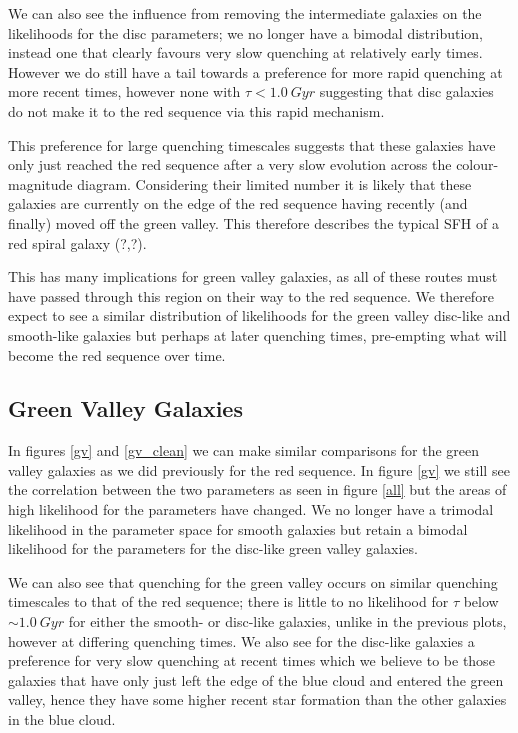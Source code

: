 \documentclass{mn2e}
\begin{document}
We can also see the influence from removing the intermediate galaxies on the likelihoods for the disc parameters; we no longer have a bimodal distribution, instead one that clearly favours very slow quenching at relatively early times. However we do still have a tail towards a preference for more rapid quenching at more recent times, however none with $\tau < 1.0~Gyr$ suggesting that disc galaxies do not make it to the red sequence via this rapid mechanism.

This preference for large quenching timescales suggests that these galaxies have only just reached the red sequence after a very slow evolution across the colour-magnitude diagram. Considering their limited number it is likely that these galaxies are currently on the edge of the red sequence having recently (and finally) moved off the green valley. This therefore describes the typical SFH of a red spiral galaxy (?,?). 

This has many implications for green valley galaxies, as all of these routes must have passed through this region on their way to the red sequence. We therefore expect to see a similar distribution of likelihoods for the green valley disc-like and smooth-like galaxies but perhaps at later quenching times, pre-empting what will become the red sequence over time. 

\subsection{Green Valley Galaxies}


In figures \ref{gv} and \ref{gv_clean} we can make similar comparisons for the green valley galaxies as we did previously for the red sequence. In figure \ref{gv} we still see the correlation between the two parameters as seen in figure \ref{all} but the areas of high likelihood for the parameters have changed. We no longer have a trimodal likelihood in the parameter space for smooth galaxies but retain a bimodal likelihood for the parameters for the disc-like green valley galaxies. 

We can also see that quenching for the green valley occurs on similar quenching timescales to that of the red sequence; there is little to no likelihood for $\tau$ below $\sim 1.0 ~Gyr$ for either the smooth- or disc-like galaxies, unlike in the previous plots, however at differing quenching times. We also see for the disc-like galaxies a preference for very slow quenching at recent times which we believe to be those galaxies that have only just left the edge of the blue cloud and entered the green valley, hence they have some higher recent star formation than the other galaxies in the blue cloud.
\end{document}
